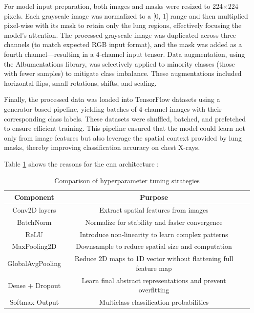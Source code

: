 \documentclass{article}
\begin{document}
For model input preparation, both images and masks were resized to 224×224 pixels. Each grayscale image was normalized to a [0, 1] range and then multiplied pixel-wise with its mask to retain only the lung regions, effectively focusing the model’s attention. The processed grayscale image was duplicated across three channels (to match expected RGB input format), and the mask was added as a fourth channel—resulting in a 4-channel input tensor. Data augmentation, using the Albumentations library, was selectively applied to minority classes (those with fewer samples) to mitigate class imbalance. These augmentations included horizontal flips, small rotations, shifts, and scaling.

Finally, the processed data was loaded into TensorFlow datasets using a generator-based pipeline, yielding batches of 4-channel images with their corresponding class labels. These datasets were shuffled, batched, and prefetched to ensure efficient training. This pipeline ensured that the model could learn not only from image features but also leverage the spatial context provided by lung masks, thereby improving classification accuracy on chest X-rays.


Table \ref{tab:cnn_architecture} shows the reasons for the cnn architecture :
\begin{table}[h]
    \centering
    \renewcommand{\arraystretch}{1.3}
    \begin{tabular}{|c|c|p{8cm}|}
        \hline
        \textbf{Component} & \textbf{Purpose} \\ \hline
        Conv2D layers & Extract spatial features from images \\ \hline
        BatchNorm & Normalize for stability and faster convergence \\ \hline
        ReLU & Introduce non-linearity to learn complex patterns \\ \hline
        MaxPooling2D & Downsample to reduce spatial size and computation \\ \hline
        GlobalAvgPooling & Reduce 2D maps to 1D vector without flattening full feature map \\ \hline
        Dense + Dropout & Learn final abstract representations and prevent overfitting \\ \hline
        Softmax Output	& Multiclass classification probabilities \\ \hline
    \end{tabular}
    \caption{Comparison of hyperparameter tuning strategies}
    \label{tab:cnn_architecture}
\end{table}
\end{document}

